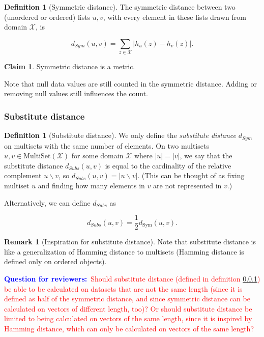 \documentclass[11pt,a4paper]{article}
\theoremstyle{definition}
\newtheorem{remark}[theorem]{Remark}
\newtheorem{definition}[theorem]{Definition}
\newtheorem{claim}[theorem]{Claim}
\newcommand{\MultiSet}{\mathrm{MultiSet}}
\newcommand{\questionr}[1]{\textcolor{blue}{\textbf{Question for reviewers:}}\textcolor{red}{~#1}}
\begin{document}

\begin{definition}[Symmetric distance]

The symmetric distance between two (unordered or ordered) lists $u,v$, with every element in these lists drawn from domain $\mathcal{X}$, is

\begin{equation}
    d_{Sym}(u,v)=\sum_{z\in \mathcal{X}} |h_u(z)- h_v(z)|.
\end{equation}
    
\end{definition}

\begin{claim}
Symmetric distance is a metric.
\end{claim}

Note that null data values are still counted in the symmetric distance. Adding or removing null values still influences the count.

\subsubsection{Substitute distance}
\label{defn:subst-dist}
\begin{definition}[Substitute distance]
We only define the \emph{substitute distance} $d_{Sym}$ on multisets with the same number of elements. On two multisets $u,v\in \MultiSet(\mathcal{X})$ for some domain $\mathcal{X}$ where $|u| = |v|$, we say that the substitute distance $d_{Subs}(u,v)$ is equal to the cardinality of the relative complement $u \backslash v$, so $d_{Subs}(u,v) = |u\backslash v|$. (This can be thought of as fixing multiset $u$ and finding how many elements in $v$ are not represented in $v$.) 

Alternatively, we can define $d_{Subs}$ as

$$d_{Subs}(u,v) = \frac{1}{2}d_{\text{Sym}}(u,v).$$
\end{definition}

\begin{remark}[Inspiration for substitute distance]
    Note that substitute distance is like a generalization of Hamming distance to multisets (Hamming distance is defined only on ordered objects).
\end{remark}

\questionr{Should substitute distance (defined in definition \ref{defn:subst-dist}) be able to be calculated on datasets that are not the same length (since it is defined as half of the symmetric distance, and since symmetric distance can be calculated on vectors of different length, too)? Or should substitute distance be limited to being calculated on vectors of the same length, since it is inspired by Hamming distance, which can only be calculated on vectors of the same length?}
\end{document}
